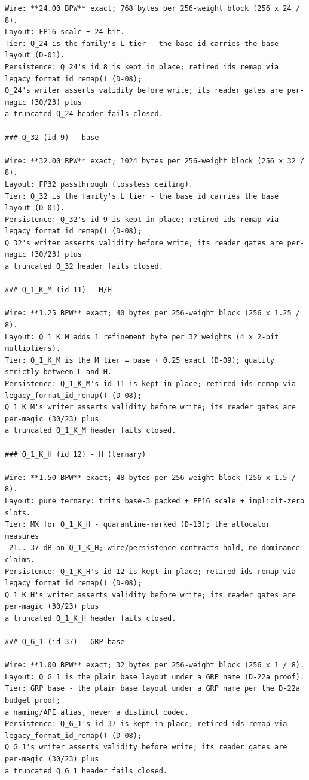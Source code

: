 \begin{Verbatim}[breaklines,breakanywhere,fontsize=\footnotesize]
Wire: **24.00 BPW** exact; 768 bytes per 256-weight block (256 x 24 / 8).
Layout: FP16 scale + 24-bit.
Tier: Q_24 is the family's L tier - the base id carries the base layout (D-01).
Persistence: Q_24's id 8 is kept in place; retired ids remap via legacy_format_id_remap() (D-08);
Q_24's writer asserts validity before write; its reader gates are per-magic (30/23) plus
a truncated Q_24 header fails closed.

### Q_32 (id 9) - base

Wire: **32.00 BPW** exact; 1024 bytes per 256-weight block (256 x 32 / 8).
Layout: FP32 passthrough (lossless ceiling).
Tier: Q_32 is the family's L tier - the base id carries the base layout (D-01).
Persistence: Q_32's id 9 is kept in place; retired ids remap via legacy_format_id_remap() (D-08);
Q_32's writer asserts validity before write; its reader gates are per-magic (30/23) plus
a truncated Q_32 header fails closed.

### Q_1_K_M (id 11) - M/H

Wire: **1.25 BPW** exact; 40 bytes per 256-weight block (256 x 1.25 / 8).
Layout: Q_1_K_M adds 1 refinement byte per 32 weights (4 x 2-bit multipliers).
Tier: Q_1_K_M is the M tier = base + 0.25 exact (D-09); quality strictly between L and H.
Persistence: Q_1_K_M's id 11 is kept in place; retired ids remap via legacy_format_id_remap() (D-08);
Q_1_K_M's writer asserts validity before write; its reader gates are per-magic (30/23) plus
a truncated Q_1_K_M header fails closed.

### Q_1_K_H (id 12) - H (ternary)

Wire: **1.50 BPW** exact; 48 bytes per 256-weight block (256 x 1.5 / 8).
Layout: pure ternary: trits base-3 packed + FP16 scale + implicit-zero slots.
Tier: MX for Q_1_K_H - quarantine-marked (D-13); the allocator measures
-21..-37 dB on Q_1_K_H; wire/persistence contracts hold, no dominance claims.
Persistence: Q_1_K_H's id 12 is kept in place; retired ids remap via legacy_format_id_remap() (D-08);
Q_1_K_H's writer asserts validity before write; its reader gates are per-magic (30/23) plus
a truncated Q_1_K_H header fails closed.

### Q_G_1 (id 37) - GRP base

Wire: **1.00 BPW** exact; 32 bytes per 256-weight block (256 x 1 / 8).
Layout: Q_G_1 is the plain base layout under a GRP name (D-22a proof).
Tier: GRP base - the plain base layout under a GRP name per the D-22a budget proof;
a naming/API alias, never a distinct codec.
Persistence: Q_G_1's id 37 is kept in place; retired ids remap via legacy_format_id_remap() (D-08);
Q_G_1's writer asserts validity before write; its reader gates are per-magic (30/23) plus
a truncated Q_G_1 header fails closed.


\end{Verbatim}
